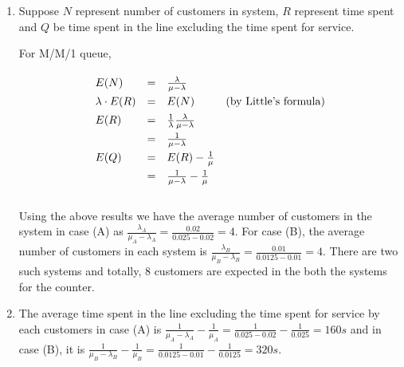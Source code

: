 \documentclass[12pt, oneside]{article}
\begin{document}
\begin{enumerate}
\begin{enumerate}[label=(\roman*)]
\item 
        Suppose $N$ represent number of customers in system, $R$ represent time spent and $Q$ be time spent in the line excluding the time spent for service.
        
        For M/M/1 queue,
        
        \[\def\arraystretch{1.4}
            \begin{array}{lclr}
                E(N) & = & \frac{\lambda}{\mu-\lambda} & ~ \\
                \lambda \cdot E(R) & = & E(N) & \text{(by Little's formula)} \\ 
                E(R) & = & \frac{1}{\lambda} \frac{\lambda}{\mu-\lambda} & ~ \\
                ~ & = & \frac{1}{\mu-\lambda} & ~ \\
                E(Q) & = & E(R) - \frac{1}{\mu} & ~ \\
                ~ & = & \frac{1}{\mu-\lambda} - \frac{1}{\mu} & ~
            \end{array}
        \]\\
        
        Using the above results we have the average number of customers in the system in case (A) as $\frac{\lambda_A}{\mu_A-\lambda_A} = \frac{0.02}{0.025-0.02} = 4$. For case (B), the average number of customers in each system is $\frac{\lambda_B}{\mu_B-\lambda_B} = \frac{0.01}{0.0125-0.01} = 4$. There are two such systems and totally, $8$ customers are expected in the both the systems for the counter.
        
\item   
        The average time spent in the line excluding the time spent for service by each customers in case (A) is $\frac{1}{\mu_A-\lambda_A} - \frac{1}{\mu_A} = \frac{1}{0.025-0.02} - \frac{1}{0.025} = 160s$ and in case (B), it is $\frac{1}{\mu_B-\lambda_B} - \frac{1}{\mu_B} = \frac{1}{0.0125-0.01} - \frac{1}{0.0125} = 320s$.


        
\end{enumerate}

\end{enumerate}
\end{document}
